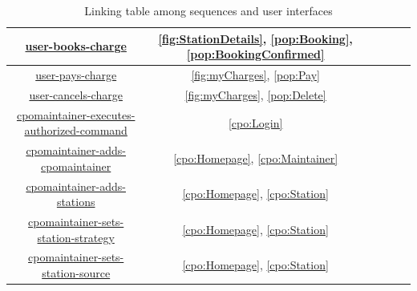 \begin{table}[H]
\begin{center}
\begin{tabular}{|c||c|c|c|c|c|}
            \hyperref[fig:user-books-charge]{user-books-charge}                                                 & \ref{fig:StationDetails}, \ref{pop:Booking},\ref{pop:BookingConfirmed} \\\hline
            \hyperref[fig:user-pays-charge]{user-pays-charge}                                                   & \ref{fig:myCharges}, \ref{pop:Pay}                                     \\\hline
            \hyperref[fig:user-cancels-charge]{user-cancels-charge}                                             & \ref{fig:myCharges}, \ref{pop:Delete}                                  \\\hline
            \hyperref[fig:cpomaintainer-executes-authorized-command]{cpomaintainer-executes-authorized-command} & \ref{cpo:Login}                                                        \\\hline
            \hyperref[fig:cpomaintainer-adds-cpomaintainer]{cpomaintainer-adds-cpomaintainer}                   & \ref{cpo:Homepage}, \ref{cpo:Maintainer}                               \\\hline
            \hyperref[fig:cpomaintainer-adds-stations]{cpomaintainer-adds-stations}                             & \ref{cpo:Homepage}, \ref{cpo:Station}                                  \\\hline
            \hyperref[fig:cpomaintainer-sets-station-strategy]{cpomaintainer-sets-station-strategy}             & \ref{cpo:Homepage}, \ref{cpo:Station}                                  \\\hline
            \hyperref[fig:cpomaintainer-sets-station-source]{cpomaintainer-sets-station-source}                 & \ref{cpo:Homepage}, \ref{cpo:Station}                                  \\\hline
        \end{tabular}
    \end{center}
    \caption{Linking table among sequences and user interfaces}
\end{table}
\clearpage